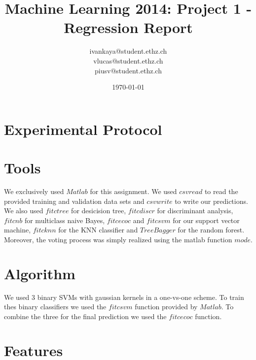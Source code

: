 \documentclass[a4paper, 11pt]{article}
\title{Machine Learning 2014: Project 1 - Regression Report}
\author{ivankaya@student.ethz.ch\\vlucas@student.ethz.ch\\piusv@student.ethz.ch\\}
\date{\today}
\begin{document}
\maketitle

\section*{Experimental Protocol}

\section{Tools}

We exclusively used $Matlab$ for this assignment.
We used $csvread$ to read the provided training and validation data sets and $csvwrite$ to write our predictions. We also used $fitctree$ for desicision tree, $fitcdiscr$ for discriminant analysis, $fitcnb$ for multiclass naive Bayes, $fitcecoc$ and $fitcsvm$ for our support vector machine, $fitcknn$ for the KNN classifier and $TreeBagger$ for the random forest. Moreover, the voting process was simply realized using the matlab function $mode$.

\section{Algorithm}

We used $3$ binary SVMs with gaussian kernels in a one-vs-one scheme. To train
thes binary classifiers we used the $fitcsvm$ function provided by $Matlab$.
To combine the three for the final prediction we used the $fitcecoc$ function.

\section{Features}
\end{document}
